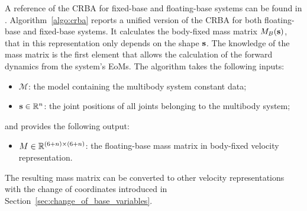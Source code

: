 A reference of the \ac{CRBA} for fixed-base and floating-base systems can be found in \parencite[Section~6.2 and Section~9.4]{featherstone_rigid_2008}.
Algorithm~\ref{algo:crba} reports a unified version of the \ac{CRBA} for both floating-base and fixed-base systems.
It calculates the body-fixed mass matrix $M_B(\mathbf{s})$, that in this representation only depends on the shape $\mathbf{s}$.
The knowledge of the mass matrix is the first element that allows the calculation of the forward dynamics from the system's \acp{EoM}.
The algorithm takes the following inputs:
%
\begin{itemize}
    \item $\mathcal{M}$: the model containing the multibody system constant data;
    \item $\mathbf{s} \in \mathbb{R}^n$: the joint positions of all joints belonging to the multibody system;
\end{itemize}
%
and provides the following output:
%
\begin{itemize}
    \item $M \in \mathbb{R}^{(6+n)\times(6+n)}$: the floating-base mass matrix in body-fixed velocity representation.
\end{itemize}
%
The resulting mass matrix can be converted to other velocity representations with the change of coordinates introduced in Section~\ref{sec:change_of_base_variables}.

